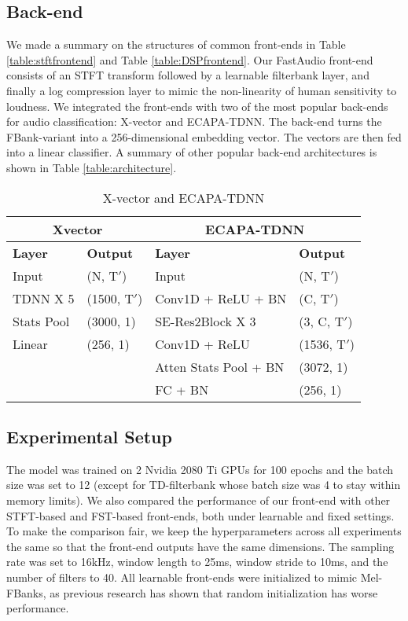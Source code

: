 \documentclass[conference]{IEEEtran}
\begin{document}
\subsection{Back-end}
We made a summary on the structures of common front-ends in Table \ref{table:stftfrontend} and Table \ref{table:DSPfrontend}. Our FastAudio front-end consists of an STFT transform followed by a learnable filterbank layer, and finally a log compression layer to mimic the non-linearity of human sensitivity to loudness. We integrated the front-ends with two of the most popular back-ends for audio classification: X-vector\cite{snyder2018x}\cite{Ravanelli2021SpeechBrainAG} and ECAPA-TDNN\cite{desplanques2020ecapa}\cite{Ravanelli2021SpeechBrainAG}. The back-end turns the FBank-variant into a 256-dimensional embedding vector. The vectors are then fed into a linear classifier. A summary of other popular back-end architectures is shown in Table \ref{table:architecture}.

\begin{table}[bhtp]
    \caption{\label{table:backend} X-vector and ECAPA-TDNN}
\centering
\begin{tabular}{ll|ll}
\hline 
\multicolumn{2}{c|}{\textbf{Xvector}} & \multicolumn{2}{c}{\textbf{ECAPA-TDNN}} \\
\hline 
\textbf{Layer} & \textbf{Output} &  \textbf{Layer} & \textbf{Output} 
\\\hline 
Input & (N, T${'}$) & Input & (N, T${'}$) 
\\\hline 
TDNN X 5  & (1500, T${'}$) & Conv1D + ReLU + BN & (C, T${'}$)
\\\hline 
Stats Pool  & (3000, 1) & SE-Res2Block X 3 & (3, C, T${'}$)
\\\hline 
Linear &  (256, 1) & Conv1D + ReLU & (1536, T${'}$)
\\\hline 
& & Atten Stats Pool + BN & (3072, 1)
\\\hline 
& &  FC + BN & (256, 1)
\\\hline 
\end{tabular}
\end{table}



\subsection{Experimental Setup}
The model was trained on 2 Nvidia 2080 Ti GPUs for 100 epochs and the batch size was set to 12 (except for TD-filterbank whose batch size was 4 to stay within memory limits). We also compared the performance of our front-end with other STFT-based and FST-based front-ends, both under learnable and fixed settings. To make the comparison fair, we keep the hyperparameters across all experiments the same so that the front-end outputs have the same dimensions. The sampling rate was set to 16kHz, window length to 25ms, window stride to 10ms, and the number of filters to 40. All learnable front-ends were initialized to mimic Mel-FBanks, as previous research\cite{Zeghidour2018LearningFF} has shown that random initialization has worse performance. 
\end{document}
